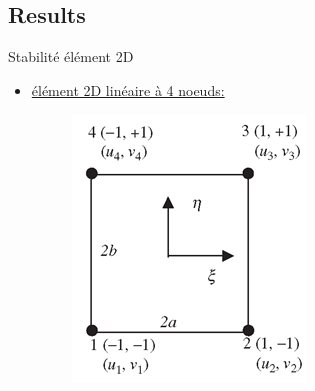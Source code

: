 \subsection{Results}
\begin{frame}{Stabilité élément 2D}
\begin{itemize}
\item \underline{élément 2D linéaire à 4 noeuds:}
\begin{figure}
\centering
\includegraphics[width=0.4\linewidth]{images/square2d.png}
\end{figure}
\end{itemize}
\end{frame}

